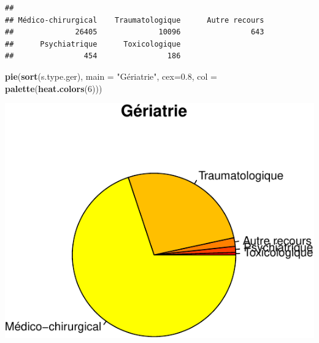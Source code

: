 \documentclass[]{article}
\newenvironment{Shaded}{\begin{snugshade}}{\end{snugshade}}
\newcommand{\KeywordTok}[1]{\textcolor[rgb]{0.13,0.29,0.53}{\textbf{{#1}}}}
\newcommand{\DataTypeTok}[1]{\textcolor[rgb]{0.13,0.29,0.53}{{#1}}}
\newcommand{\DecValTok}[1]{\textcolor[rgb]{0.00,0.00,0.81}{{#1}}}
\newcommand{\FloatTok}[1]{\textcolor[rgb]{0.00,0.00,0.81}{{#1}}}
\newcommand{\StringTok}[1]{\textcolor[rgb]{0.31,0.60,0.02}{{#1}}}
\newcommand{\OtherTok}[1]{\textcolor[rgb]{0.56,0.35,0.01}{{#1}}}
\newcommand{\NormalTok}[1]{{#1}}
\begin{document}
\begin{Shaded}
\end{Shaded}

\begin{verbatim}
## 
## Médico-chirurgical    Traumatologique      Autre recours 
##              26405              10096                643 
##      Psychiatrique      Toxicologique 
##                454                186
\end{verbatim}

\begin{Shaded}
\begin{Highlighting}[]
\KeywordTok{pie}\NormalTok{(}\KeywordTok{sort}\NormalTok{(s.type.ger), }\DataTypeTok{main =} \StringTok{"Gériatrie"}\NormalTok{, }\DataTypeTok{cex=}\FloatTok{0.8}\NormalTok{, }\DataTypeTok{col =} \KeywordTok{palette}\NormalTok{(}\KeywordTok{heat.colors}\NormalTok{(}\DecValTok{6}\NormalTok{)))}
\end{Highlighting}
\end{Shaded}

\includegraphics{analyse_merge_files/figure-latex/geriatrie-1.pdf}\\
\end{document}
